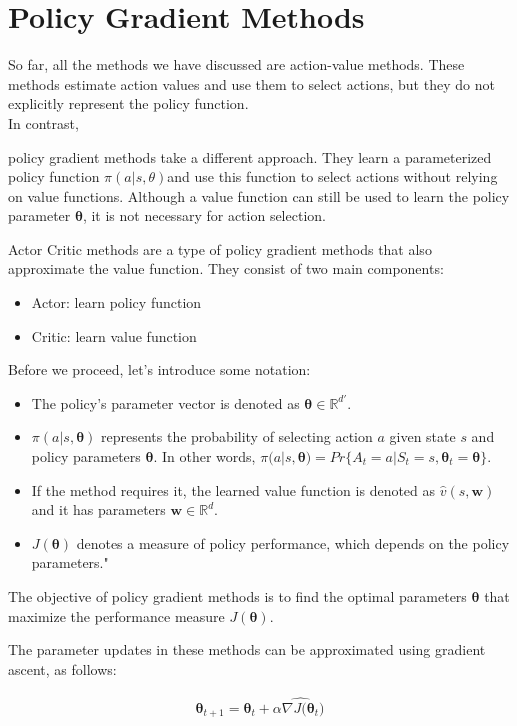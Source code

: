 \section{Policy Gradient Methods}
So far, all the methods we have discussed are action-value methods. These methods estimate action values and use them to select actions, but they do not explicitly represent the policy function.\\

In contrast, {policy gradient methods take a different approach. They learn a parameterized policy function $\pi(a|s, \theta)$and use this function to select actions without relying on value functions. Although a value function can still be used to learn the policy parameter $\bm{\theta}$, it is not necessary for action selection.

Actor Critic methods are a type of policy gradient methods that also approximate the value function. They consist of two main components:
\begin{itemize}
    \item Actor: learn policy function
    \item Critic: learn value function
\end{itemize}

Before we proceed, let's introduce some notation:
\begin{itemize}
    \item The policy's parameter vector is denoted as $\bm{\theta}\in\mathbb{R}^{d'}$.
    \item $\pi(a|s, \bm{\theta})$ represents the probability of selecting action $a$ given state $s$ and policy parameters $\bm{\theta}$. In other words, $\pi(a|s, \bm{\theta})=Pr\{A_t=a|S_t=s,\bm{\theta}_t=\bm{\theta}\}$.
    \item If the method requires it, the learned value function is denoted as $\hat{v}(s, \bm{w})$ and it has parameters $\bm{w}\in\mathbb{R}^{d}$.
    \item $J(\bm{\theta})$ denotes a measure of policy performance, which depends on the policy parameters."
\end{itemize}

The objective of policy gradient methods is to find the optimal parameters $\bm{\theta}$ that maximize the performance measure $J(\bm{\theta})$.

The parameter updates in these methods can be approximated using gradient ascent, as follows:

\begin{align}
\bm{\theta}_{t+1} = \bm{\theta}_t + \alpha \widehat{\nabla J(\bm{\theta}_t})
\end{align}

}
